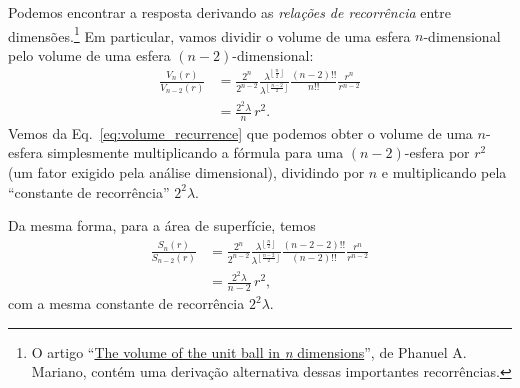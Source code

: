 {Podemos encontrar a resposta derivando as \emph{relações de recorrência} entre dimensões.\footnote{O artigo ``\href{http://www2.math.uconn.edu/~mariano/research/MathClubsp14\%20.pdf}{The volume of the unit ball in \emph{n} dimensions}'', de Phanuel A. Mariano, contém uma derivação alternativa dessas importantes recorrências.} Em particular, vamos dividir o volume de uma esfera $n$-dimensional pelo volume de uma esfera $(n-2)$-dimensional:
\begin{equation}
\label{eq:volume_recurrence}
\begin{split}
\frac{V_n(r)}{V_{n-2}(r)} & =
\frac{2^n}{2^{n-2}}
\frac{\lambda^{\left\lfloor \frac{n}{2} \right\rfloor}}{\lambda^{\left\lfloor \frac{n-2}{2} \right\rfloor}}
\frac{(n-2)!!}{n!!}
\frac{r^{n}}{r^{n-2}}
\\ & = \frac{2^2\lambda}{n}\,r^2.
\end{split}
\end{equation}
Vemos da Eq.~\eqref{eq:volume_recurrence} que podemos obter o volume de uma $n$-esfera simplesmente multiplicando a fórmula para uma $(n-2)$-esfera por $r^2$ (um fator exigido pela análise dimensional), dividindo por $n$ e multiplicando pela ``constante de recorrência'' $2^2\lambda$.

Da mesma forma, para a área de superfície, temos
\begin{equation}
\label{eq:surface_area_recurrence}
\begin{split}
\frac{S_n(r)}{S_{n-2}(r)} & =
\frac{2^n}{2^{n-2}}
\frac{\lambda^{\left\lfloor \frac{n}{2} \right\rfloor}}{\lambda^{\left\lfloor \frac{n-2}{2} \right\rfloor}}
\frac{(n-2-2)!!}{(n-2)!!}
\frac{r^{n}}{r^{n-2}}
\\ & = \frac{2^2\lambda}{n-2}\,r^2,
\end{split}
\end{equation}
com a mesma constante de recorrência $2^2\lambda$.

}
